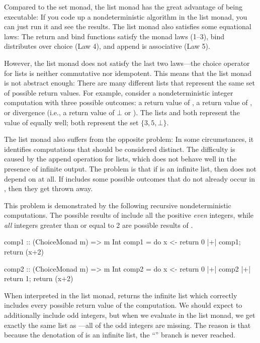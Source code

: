 Compared to the set monad, the list monad has the great advantage of being executable: If you code up a nondeterministic algorithm in the list monad, you can just run it and see the results. The list monad also satisfies some equational laws: The return and bind functions satisfy the monad laws (1--3), bind distributes over choice (Law 4), and append is associative (Law 5).

However, the list monad does not satisfy the last two laws---the choice operator for lists is neither commutative nor idempotent. This means that the list monad is not abstract enough: There are many different lists that represent the same set of possible return values. For example, consider a nondeterministic integer computation  with three possible outcomes: a return value of , a return value of , or divergence (i.e., a return value of $\bot$ or ). The lists \hs{[3,5,undefined]} and \hs{[5,5,3,undefined,3]} both represent the value of  equally well; both represent the set $\{3,5,\bot\}$.

The list monad also suffers from the opposite problem: In some circumstances, it identifies computations that should be considered distinct. The difficulty is caused by the append operation for lists, which does not behave well in the presence of infinite output. The problem is that if  is an infinite list, then  does not depend on  at all. If  includes some possible outcomes that do not already occur in , then they get thrown away.

This problem is demonstrated by the following recursive nondeterministic computations. The possible results of  include all the positive \emph{even} integers, while \emph{all} integers greater than or equal to 2 are possible results of .
\begin{hscode}
comp1 :: (ChoiceMonad m) => m Int
comp1 = do {x <- return 0 |+| comp1; return (x+2)}
\end{hscode}
\begin{hscode}
comp2 :: (ChoiceMonad m) => m Int
comp2 = do {x <- return 0 |+| comp2 |+| return 1; return (x+2)}
\end{hscode}
When interpreted in the list monad,  returns the infinite list \hs{[2,4,6,8,...]} which correctly includes every possible return value of the computation. We should expect  to additionally include odd integers, but when we evaluate  in the list monad, we get exactly the same list as ---all of the odd integers are missing. The reason is that because the denotation of  is an infinite list, the ``'' branch is never reached.

